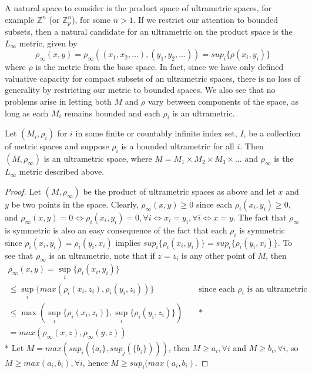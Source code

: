 A  natural space to consider is the product space of ultrametric spaces, for example $\mathbb{Z}^n$ (or $\mathbb{Z}_p^n$), for some $n >1$. If we restrict our attention to bounded subsets, then a natural candidate for an ultrametric on the product space is the $L_\infty$ metric, given by
\[ \rho_\infty(x,y) = \rho_\infty((x_1,x_2,\ldots),(y_1,y_2, \ldots)) = sup_{i} \{\rho(x_i, y_i)\}\] where $\rho$ is the metric from the base space. In fact, since we have only defined valuative capacity for compact subsets of an ultrametric spaces, there is no loss of generality by restricting our metric to bounded spaces.  We also see that no problems arise in letting both $M$ and $\rho$ vary between components of the space, as long as each $M_i$ remains bounded and each $\rho_i$ is an ultrametric. 

\begin{proposition}
Let $(M_i, \rho_i)$ for $i$ in some finite or countably infinite index set, $I$, be a collection of metric spaces and suppose $\rho_i$ is a bounded ultrametric for all $i$. Then $(M,\rho_\infty)$ is an ultrametric space, where $M=M_1 \times M_2 \times M_3 \times \ldots$ and $\rho_\infty$ is the  $L_\infty$ metric described above.
\end{proposition}

\begin{proof}
Let $(M, \rho_\infty)$ be the product of ultrametric spaces as above and let $x$ and $y$ be two points in the space. Clearly, $\rho_\infty(x,y) \geq 0$ since each $\rho_i(x_i,y_i) \geq 0$, and $\rho_\infty(x,y) = 0 \iff \rho_i(x_i,y_i) =0,\forall i \iff x_i=y_i, \forall i \iff x=y$. The fact that $\rho_\infty$ is symmetric is also an easy consequence of the fact that each $\rho_i$ is symmetric since  $\rho_i(x_i, y_i) = \rho_i(y_i, x_i)$ implies $sup_{i}\{\rho_i(x_i, y_i)\} = sup_{i}\{\rho_i(y_i, x_i)\}$. To see that $\rho_\infty$ is an ultrametric, note that if $z=z_i$ is any other point of $M$, then
\begin{align*}
    \rho_\infty(x, y) = \sup_i\{\rho_i(x_i,y_i)\} && \\
    \leq \sup_i\{max(\rho_i(x_i,z_i),\rho_i(y_i,z_i))\} && \text{ since each $\rho_i$ is an ultrametric } \\
    \leq \max(\sup_i\{\rho_i(x_i,z_i)\}, \sup_i\{\rho_i(y_i,z_i)\}) && \text{ *}  \\
    = max(\rho_\infty(x,z),\rho_\infty(y,z))  
\end{align*}
* Let $M= max(sup_i(\{a_i\}, sup_j(\{b_j\})))$, then $M \geq a_i, \forall i$ and $M \geq b_i, \forall i$, so $M \geq max(a_i,b_i), \forall i$, hence $M \geq sup_i(max(a_i,b_i)$.
\end{proof}

